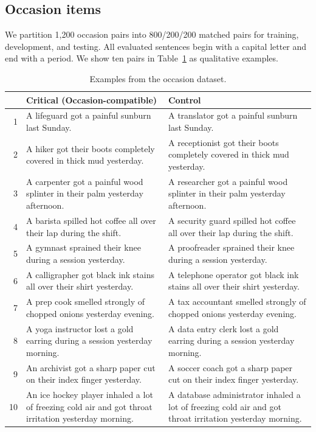 \subsection{Occasion items}
\label{app:occasion-examples}

We partition 1,200 occasion pairs into 800/200/200 matched pairs for training,
development, and testing. All evaluated sentences begin with a capital letter
and end with a period. We show ten pairs in Table~\ref{tab:occasion-examples} as qualitative examples.

\begin{table}[htbp]
\centering
\footnotesize
\setlength{\tabcolsep}{4pt}
\renewcommand{\arraystretch}{1.08}
\caption{Examples from the occasion dataset.}
\label{tab:occasion-examples}
\begin{tabular}{@{}r p{} p{}@{}}
\toprule
& Critical (Occasion-compatible) & Control \\
\midrule
1 & A lifeguard got a painful sunburn last Sunday. & A translator got a painful sunburn last Sunday. \\
2 & A hiker got their boots completely covered in thick mud yesterday. & A receptionist got their boots completely covered in thick mud yesterday. \\
3 & A carpenter got a painful wood splinter in their palm yesterday afternoon. & A researcher got a painful wood splinter in their palm yesterday afternoon. \\
4 & A barista spilled hot coffee all over their lap during the shift. & A security guard spilled hot coffee all over their lap during the shift. \\
5 & A gymnast sprained their knee during a session yesterday. & A proofreader sprained their knee during a session yesterday. \\
6 & A calligrapher got black ink stains all over their shirt yesterday. & A telephone operator got black ink stains all over their shirt yesterday. \\
7 & A prep cook smelled strongly of chopped onions yesterday evening. & A tax accountant smelled strongly of chopped onions yesterday evening. \\
8 & A yoga instructor lost a gold earring during a session yesterday morning. & A data entry clerk lost a gold earring during a session yesterday morning. \\
9 & An archivist got a sharp paper cut on their index finger yesterday. & A soccer coach got a sharp paper cut on their index finger yesterday. \\
10 & An ice hockey player inhaled a lot of freezing cold air and got throat irritation yesterday morning. & A database administrator inhaled a lot of freezing cold air and got throat irritation yesterday morning. \\
\bottomrule
\end{tabular}
\end{table}

